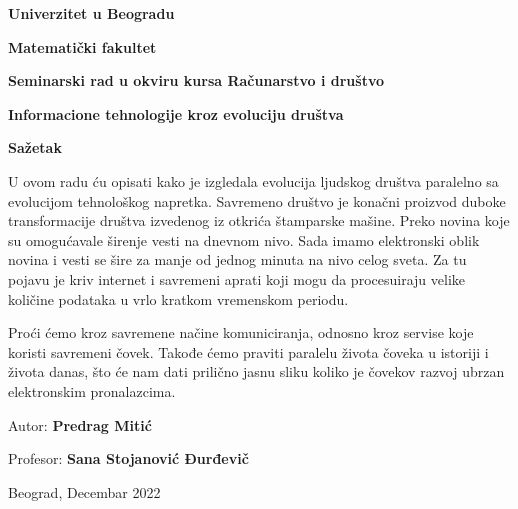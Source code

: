\documentclass[10pt]{article}
\begin{document}
	
	\begin{titlepage}
		\begin{center}
			\begin{large}
			
			    \textbf{Univerzitet u Beogradu}
				
				\textbf{Matematički fakultet}
				
				\vspace{2cm}
				
				\textbf{Seminarski rad u okviru kursa Računarstvo i društvo}
				
				\vspace{1cm}
				\textbf{\huge{Informacione tehnologije kroz evoluciju društva}}
				
			\end{large}
			
			\vspace{2cm}
	        \textbf{Sažetak}
	        \vspace{0.5cm}
	        
        	U ovom radu ću opisati kako je izgledala evolucija ljudskog društva paralelno sa evolucijom tehnološkog napretka. Savremeno društvo je konačni proizvod duboke transformacije društva izvedenog iz otkrića štamparske mašine. Preko novina koje su omogućavale širenje vesti na dnevnom nivo. Sada imamo elektronski oblik novina i vesti se šire za manje od jednog minuta na nivo celog sveta.  Za tu pojavu je kriv internet i savremeni aprati koji mogu da procesuiraju velike količine podataka u vrlo kratkom vremenskom periodu.
	
	        Proći ćemo kroz savremene načine komuniciranja, odnosno kroz servise koje koristi savremeni čovek. Takođe ćemo praviti paralelu života čoveka u istoriji i života danas, što će nam dati prilično jasnu sliku koliko je čovekov razvoj ubrzan elektronskim pronalazcima.
	
			\vspace{2cm}
		\end{center}
		\begin{flushright}
			Autor: \textbf{Predrag Mitić}
			
			Profesor: \textbf{Sana Stojanović Đurđevič}
			

		\end{flushright}
		\vspace{1cm}
		\begin{center}
			Beograd, Decembar 2022
		\end{center}
	\end{titlepage}
	
\end{document}
